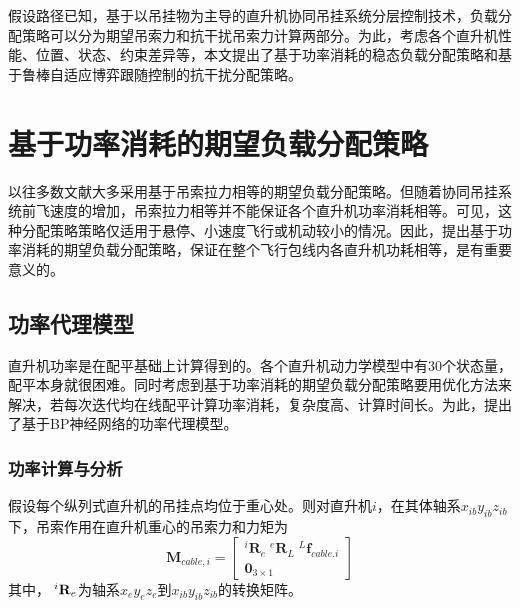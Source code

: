 假设路径已知，基于以吊挂物为主导的直升机协同吊挂系统分层控制技术，负载分配策略可以分为期望吊索力和抗干扰吊索力计算两部分。为此，考虑各个直升机性能、位置、状态、约束差异等，本文提出了基于功率消耗的稳态负载分配策略和基于鲁棒自适应博弈跟随控制的抗干扰分配策略。

\section{基于功率消耗的期望负载分配策略}\label{section:power_distribution}
以往多数文献大多采用基于吊索拉力相等的期望负载分配策略。但随着协同吊挂系统前飞速度的增加，吊索拉力相等并不能保证各个直升机功率消耗相等。可见，这种分配策略策略仅适用于悬停、小速度飞行或机动较小的情况。因此，提出基于功率消耗的期望负载分配策略，保证在整个飞行包线内各直升机功耗相等，是有重要意义的。
\subsection{功率代理模型}
直升机功率是在配平基础上计算得到的。各个直升机动力学模型中有30个状态量，配平本身就很困难。同时考虑到基于功率消耗的期望负载分配策略要用优化方法来解决，若每次迭代均在线配平计算功率消耗，复杂度高、计算时间长。为此，提出了基于BP神经网络的功率代理模型。
\subsubsection{功率计算与分析}
假设每个纵列式直升机的吊挂点均位于重心处。则对直升机$i$，在其体轴系$x_{ib}y_{ib}z_{ib}$下，吊索作用在直升机重心的吊索力和力矩为
\begin{equation}
  {{\mathbf{M}}_{cable,i}} = \left[ {\begin{array}{*{20}{c}}
    {^i{{\mathbf{R}}_e}{\;^e}{{\mathbf{R}}_L}{\;^L}{{\mathbf{f}}_{cable.i}}} \\ 
    {{{\mathbf{0}}_{3 \times 1}}} 
  \end{array}} \right]
\end{equation}
其中，${\;^i}{{\bf{R}}_e}$为轴系$x_{e}y_{e}z_{e}$到$x_{ib}y_{ib}z_{ib}$的转换矩阵。

